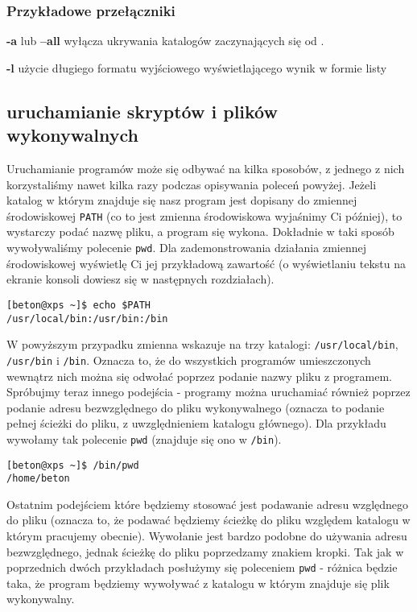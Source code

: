 \subsubsection*{Przykładowe przełączniki}
\begin{description}
\item \textbf{-a} lub \textbf{--all} wyłącza ukrywania katalogów zaczynających się od .
\item \textbf{-l} użycie długiego formatu wyjściowego wyświetlającego wynik w formie listy
\end{description}

\subsection{uruchamianie skryptów i plików wykonywalnych}
\label{sec:uruchamianie}
Uruchamianie programów może się odbywać na kilka sposobów, z jednego z nich korzystaliśmy nawet kilka razy podczas opisywania poleceń powyżej. Jeżeli katalog w którym znajduje się nasz program jest dopisany do zmiennej środowiskowej \texttt{PATH} (co to jest zmienna środowiskowa wyjaśnimy Ci później), to wystarczy podać nazwę pliku, a program się wykona. Dokładnie w taki sposób wywoływaliśmy polecenie \texttt{pwd}. Dla zademonstrowania działania zmiennej środowiskowej wyświetlę Ci jej przykładową zawartość (o wyświetlaniu tekstu na ekranie konsoli dowiesz się w następnych rozdziałach).
\begin{verbatim}
[beton@xps ~]$ echo $PATH
/usr/local/bin:/usr/bin:/bin
\end{verbatim}
W powyższym przypadku zmienna wskazuje na trzy katalogi: \texttt{/usr/local/bin}, \texttt{/usr/bin} i \texttt{/bin}. Oznacza to, że do wszystkich programów umieszczonych wewnątrz nich można się odwołać poprzez podanie nazwy pliku z programem.
\newline
Spróbujmy teraz innego podejścia - programy można uruchamiać również poprzez podanie adresu bezwzględnego do pliku wykonywalnego (oznacza to podanie pełnej ścieżki do pliku, z uwzględnieniem katalogu głównego). Dla przykładu wywołamy tak polecenie \texttt{pwd} (znajduje się ono w \texttt{/bin}).
\begin{verbatim}
[beton@xps ~]$ /bin/pwd
/home/beton
\end{verbatim}
Ostatnim podejściem które będziemy stosować jest podawanie adresu względnego do pliku (oznacza to, że podawać będziemy ścieżkę do pliku względem katalogu w którym pracujemy obecnie). Wywołanie jest bardzo podobne do używania adresu bezwzględnego, jednak ścieżkę do pliku poprzedzamy znakiem kropki. Tak jak w poprzednich dwóch przykładach posłużymy się poleceniem \texttt{pwd} - różnica będzie taka, że program będziemy wywoływać z katalogu w którym znajduje się plik wykonywalny.
